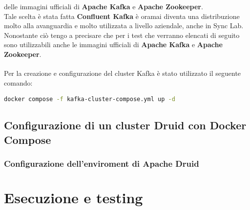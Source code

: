 delle immagini ufficiali di \textbf{Apache Kafka} e \textbf{Apache Zookeeper}. \\
Tale scelta è stata fatta \textbf{Confluent Kafka} è oramai diventa una distribuzione molto alla avanguardia e molto utilizzata 
a livello aziendale, anche in Sync Lab. \\
Nonostante ciò tengo a precisare che per i test che verranno elencati di seguito
sono utilizzabili anche le immagini ufficiali di \textbf{Apache Kafka} e \textbf{Apache Zookeeper}.\\
\\
Per la creazione e configurazione del cluster Kafka è stato utilizzato il seguente comando:
\begin{lstlisting}[language=bash]
    docker compose -f kafka-cluster-compose.yml up -d
\end{lstlisting}

\subsection{Configurazione di un cluster Druid con Docker Compose}
\subsubsection{Configurazione dell'enviroment di Apache Druid}

\section{Esecuzione e testing}
\newpage
\pagestyle{empty}
\null %
\newpage
